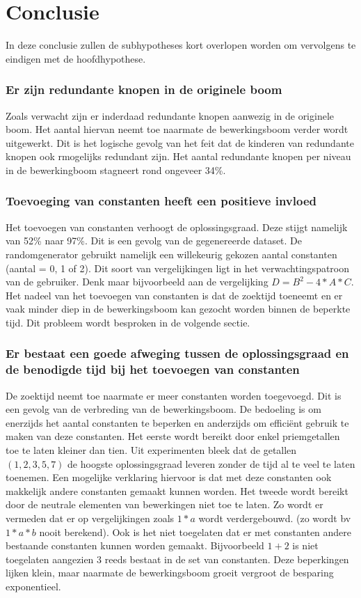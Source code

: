 \documentclass[Main.tex]{subfiles}
\begin{document}
\section{Conclusie}
In deze conclusie zullen de subhypotheses kort overlopen worden om vervolgens te eindigen met de hoofdhypothese.

\subsubsection{Er zijn redundante knopen in de originele boom}
Zoals verwacht zijn er inderdaad redundante knopen aanwezig in de originele boom. Het aantal hiervan neemt toe naarmate de bewerkingsboom verder wordt uitgewerkt. Dit is het logische gevolg van het feit dat de kinderen van redundante knopen ook rmogelijks redundant zijn. Het aantal redundante knopen per niveau in de bewerkingboom stagneert rond ongeveer 34\%.

\subsubsection{Toevoeging van constanten heeft een positieve invloed}
Het toevoegen van constanten verhoogt de oplossingsgraad. Deze stijgt namelijk van 52\% naar 97\%. Dit is een gevolg van de gegenereerde dataset. De randomgenerator gebruikt namelijk een willekeurig gekozen aantal constanten (aantal = 0, 1 of 2). Dit soort van vergelijkingen ligt in het verwachtingspatroon van de gebruiker. Denk maar bijvoorbeeld aan de vergelijking $D = B^{2} - 4 \ast A \ast C$. Het nadeel van het toevoegen van constanten is dat de zoektijd toeneemt en er vaak minder diep in de bewerkingsboom kan gezocht worden binnen de beperkte tijd. Dit probleem wordt besproken in de volgende sectie.

\subsubsection{Er bestaat een goede afweging tussen de oplossingsgraad en de benodigde tijd bij het toevoegen van constanten}
De zoektijd neemt toe naarmate er meer constanten worden toegevoegd. Dit is een gevolg van de verbreding van de bewerkingsboom. De bedoeling is om enerzijds het aantal constanten te beperken en anderzijds om effici\"ent gebruik te maken van deze constanten. Het eerste wordt bereikt door enkel priemgetallen toe te laten kleiner dan tien. Uit experimenten bleek dat de getallen $(1, 2, 3, 5, 7)$ de hoogste oplossingsgraad leveren zonder de tijd al te veel te laten toenemen. Een mogelijke verklaring hiervoor is dat met deze constanten ook makkelijk andere constanten gemaakt kunnen worden. Het tweede wordt bereikt door de neutrale elementen van bewerkingen niet toe te laten. Zo wordt er vermeden dat er op vergelijkingen zoals $1*a$ wordt verdergebouwd. (zo wordt bv $1*a*b$ nooit berekend). Ook is het niet toegelaten dat er met constanten andere bestaande constanten kunnen worden gemaakt. Bijvoorbeeld $1+2$ is niet toegelaten aangezien $3$ reeds bestaat in de set van constanten. Deze beperkingen lijken klein, maar naarmate de bewerkingsboom groeit vergroot de besparing exponentieel.
\end{document}
